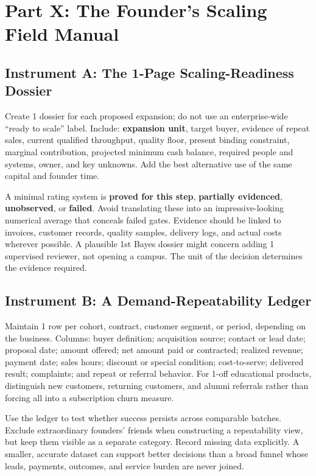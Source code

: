 \section*{Part X: The Founder's Scaling Field Manual}
\label{sec:part10_founders_scaling_field_manual}

\subsection{Instrument A: The 1-Page Scaling-Readiness Dossier}
\label{sec:instrument_a_readiness_dossier}

Create 1 dossier for each proposed expansion; do not use an enterprise-wide ``ready to scale'' label. Include: \textbf{expansion unit}, target buyer, evidence of repeat sales, current qualified throughput, quality floor, present binding constraint, marginal contribution, projected minimum cash balance, required people and systems, owner, and key unknowns. Add the best alternative use of the same capital and founder time.

A minimal rating system is \textbf{proved for this step}, \textbf{partially evidenced}, \textbf{unobserved}, or \textbf{failed}. Avoid translating these into an impressive-looking numerical average that conceals failed gates. Evidence should be linked to invoices, customer records, quality samples, delivery logs, and actual costs wherever possible. A plausible 1st Bayes dossier might concern adding 1 supervised reviewer, not opening a campus. The unit of the decision determines the evidence required.

\subsection{Instrument B: A Demand-Repeatability Ledger}
\label{sec:instrument_b_repeatability_ledger}

Maintain 1 row per cohort, contract, customer segment, or period, depending on the business. Columns: buyer definition; acquisition source; contact or lead date; proposal date; amount offered; net amount paid or contracted; realized revenue; payment date; sales hours; discount or special condition; cost-to-serve; delivered result; complaints; and repeat or referral behavior. For 1-off educational products, distinguish new customers, returning customers, and alumni referrals rather than forcing all into a subscription churn measure.

Use the ledger to test whether success persists across comparable batches. Exclude extraordinary founders' friends when constructing a repeatability view, but keep them visible as a separate category. Record missing data explicitly. A smaller, accurate dataset can support better decisions than a broad funnel whose leads, payments, outcomes, and service burden are never joined.

